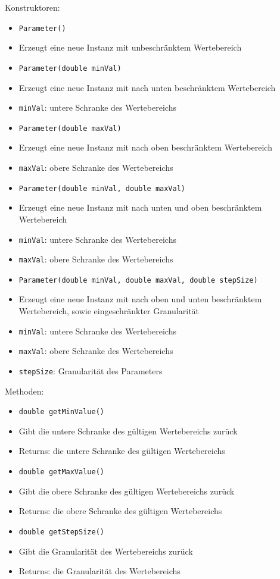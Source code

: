 \documentclass[parskip=full,11pt]{scrartcl}
\begin{document}
Konstruktoren:
\begin{itemize}\itemsep -10pt
\item \texttt{Parameter()}
\item[] Erzeugt eine neue Instanz mit unbeschränktem Wertebereich 
\item \texttt{Parameter(double minVal)}
\item[] Erzeugt eine neue Instanz mit nach unten beschränktem Wertebereich
\item[] \texttt{minVal}: untere Schranke des Wertebereichs
\item \texttt{Parameter(double maxVal)}
\item[] Erzeugt eine neue Instanz mit nach oben beschränktem Wertebereich
\item[] \texttt{maxVal}: obere Schranke des Wertebereichs
\item \texttt{Parameter(double minVal, double maxVal)}
\item[] Erzeugt eine neue Instanz mit nach unten und oben beschränktem Wertebereich
\item[] \texttt{minVal}: untere Schranke des Wertebereichs
\item[] \texttt{maxVal}: obere Schranke des Wertebereichs
\item \texttt{Parameter(double minVal, double maxVal, double stepSize)}
\item[] Erzeugt eine neue Instanz mit nach oben und unten beschränktem Wertebereich, sowie eingeschränkter Granularität
\item[] \texttt{minVal}: untere Schranke des Wertebereichs
\item[] \texttt{maxVal}: obere Schranke des Wertebereichs
\item[] \texttt{stepSize}: Granularität des Parameters

\end{itemize}

Methoden:

\begin{itemize}\itemsep -10pt
\item \texttt{double getMinValue()}
\item[] Gibt die untere Schranke des gültigen Wertebereichs zurück
\item[] Returns: die untere Schranke des gültigen Wertebereichs
\item \texttt{double getMaxValue()}
\item[] Gibt die obere Schranke des gültigen Wertebereichs zurück
\item[]Returns: die obere Schranke des gültigen Wertebereichs
\item \texttt{double getStepSize()}
\item[] Gibt die Granularität des Wertebereichs zurück
\item[]Returns: die Granularität des Wertebereichs
\end{itemize}
\end{document}
